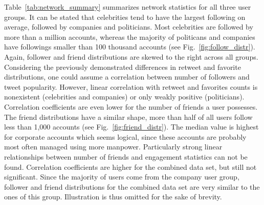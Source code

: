 Table~\ref{tab:network_summary} summarizes network statistics for all three
user groups.
It can be stated that celebrities tend to have the largest following on average,
followed by companies and politicians.
Most celebrities are followed by more than a million accounts, whereas the
majority of politicans and companies have followings smaller than 100 thousand
accounts (see Fig.~\ref{fig:follow_distr}).
Again, follower and friend distributions are skewed to the right across all
groups.
Considering the previously demonstrated differences in retweet and favorite
distributions, one could assume a correlation between number of followers
and tweet popularity.
However, linear correlation with retweet and favorites counts is nonexistent
(celebrities and companies) or only weakly positive (politicians).
Correlation coefficients are even lower for the number of friends a user
possesses.
The friend distributions have a similar shape, more than half of all users
follow less than 1,000 accounts (see Fig.~\ref{fig:friend_distr}).
The median value is highest for corporate accounts which seems logical, since
these accounts are probably most often managed using more manpower.
Particularly strong linear relationships between number of friends and engagement statistics can not
be found.
Correlation coefficients are higher for the combined data set, but still not
significant.
Since the majority of users come from the company user group, follower and friend
distributions for the combined data set are very similar to the ones of this group.
Illustration is thus omitted for the sake of brevity.

